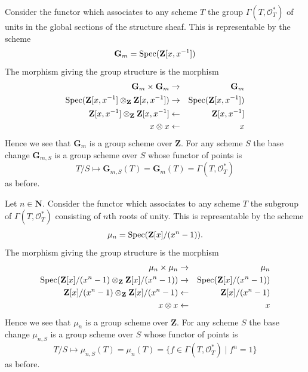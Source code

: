 \begin{example}
\label{example-multiplicative-group}
Consider the functor which associates
to any scheme $T$ the group $\Gamma(T, \mathcal{O}_T^*)$
of units in the global sections of the structure sheaf.
This is representable by the scheme
$$
\mathbf{G}_m = \mathop{\mathrm{Spec}}(\mathbf{Z}[x, x^{-1}])
$$
The morphism giving the group structure is the morphism
\begin{eqnarray*}
\mathbf{G}_m \times \mathbf{G}_m & \to & \mathbf{G}_m \\
\mathop{\mathrm{Spec}}(\mathbf{Z}[x, x^{-1}] \otimes_{\mathbf{Z}} \mathbf{Z}[x, x^{-1}])
& \to &
\mathop{\mathrm{Spec}}(\mathbf{Z}[x, x^{-1}]) \\
\mathbf{Z}[x, x^{-1}] \otimes_{\mathbf{Z}} \mathbf{Z}[x, x^{-1}]
& \leftarrow &
\mathbf{Z}[x, x^{-1}] \\
x \otimes x & \leftarrow & x
\end{eqnarray*}
Hence we see that $\mathbf{G}_m$ is a group scheme over $\mathbf{Z}$.
For any scheme $S$ the base change $\mathbf{G}_{m, S}$ is a
group scheme over $S$ whose functor of points is
$$
T/S
\longmapsto
\mathbf{G}_{m, S}(T) = \mathbf{G}_m(T) = \Gamma(T, \mathcal{O}_T^*)
$$
as before.
\end{example}

\begin{example}
\label{example-roots-of-unity}
Let $n \in \mathbf{N}$.
Consider the functor which associates
to any scheme $T$ the subgroup of $\Gamma(T, \mathcal{O}_T^*)$
consisting of $n$th roots of unity.
This is representable by the scheme
$$
\mu_n = \mathop{\mathrm{Spec}}(\mathbf{Z}[x]/(x^n - 1)).
$$
The morphism giving the group structure is the morphism
\begin{eqnarray*}
\mu_n \times \mu_n & \to & \mu_n \\
\mathop{\mathrm{Spec}}(
\mathbf{Z}[x]/(x^n - 1)
\otimes_{\mathbf{Z}}
\mathbf{Z}[x]/(x^n - 1))
& \to &
\mathop{\mathrm{Spec}}(\mathbf{Z}[x]/(x^n - 1)) \\
\mathbf{Z}[x]/(x^n - 1) \otimes_{\mathbf{Z}} \mathbf{Z}[x]/(x^n - 1)
& \leftarrow &
\mathbf{Z}[x]/(x^n - 1) \\
x \otimes x & \leftarrow & x
\end{eqnarray*}
Hence we see that $\mu_n$ is a group scheme over $\mathbf{Z}$.
For any scheme $S$ the base change $\mu_{n, S}$ is a
group scheme over $S$ whose functor of points is
$$
T/S
\longmapsto
\mu_{n, S}(T) = \mu_n(T) = \{f \in \Gamma(T, \mathcal{O}_T^*) \mid f^n = 1\}
$$
as before.
\end{example}


